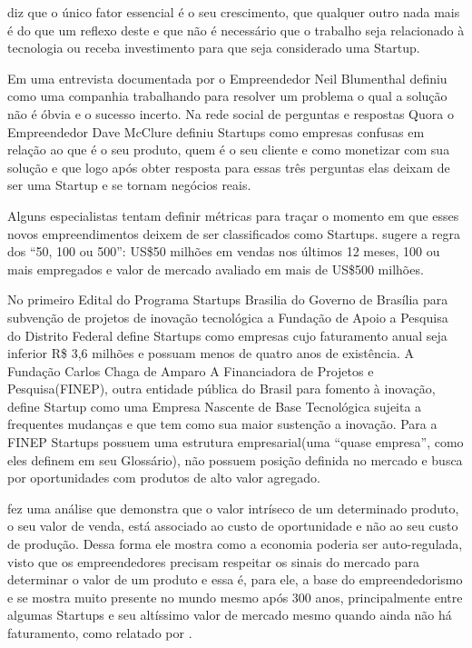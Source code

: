 \cite{Graham2012} diz que o único fator essencial é o seu crescimento, que qualquer outro nada mais é do que um reflexo deste e que não é necessário que o trabalho seja relacionado à tecnologia ou receba investimento para que seja considerado uma Startup.

Em uma entrevista documentada por \cite{Robehmed2013} o Empreendedor Neil Blumenthal definiu como uma companhia trabalhando para resolver um problema o qual a solução não é óbvia e o sucesso incerto. Na rede social de perguntas e respostas Quora o Empreendedor Dave McClure definiu Startups como empresas confusas em relação ao que é o seu produto, quem é o seu cliente e como monetizar com sua solução e que logo após obter resposta para essas três perguntas elas deixam de ser uma Startup e se tornam negócios reais.

Alguns especialistas tentam definir métricas para traçar o momento em que esses novos empreendimentos deixem de ser classificados como Startups. \cite{Wilhelm2014} sugere a regra dos ``50, 100 ou 500'': US\$50 milhões em vendas nos últimos 12 meses, 100 ou mais empregados e valor de mercado avaliado em mais de US\$500 milhões.   

No primeiro Edital do Programa Startups Brasilia do Governo de Brasília para subvenção de projetos de inovação tecnológica a Fundação de Apoio a Pesquisa do Distrito Federal define Startups como empresas cujo faturamento anual seja inferior R\$ 3,6 milhões e possuam menos de quatro anos de existência. A Fundação Carlos Chaga de Amparo A Financiadora de Projetos e Pesquisa(FINEP), outra entidade pública do Brasil para fomento à inovação, define Startup como uma Empresa Nascente de Base Tecnológica sujeita a frequentes mudanças e que tem como sua maior sustenção a inovação. Para a FINEP Startups possuem uma estrutura empresarial(uma ``quase empresa'', como eles definem em seu Glossário), não possuem posição definida no mercado e busca por oportunidades com produtos de alto valor agregado.



\cite{James1953} fez uma análise que demonstra que o valor intríseco de um determinado produto, o seu valor de venda, está associado ao custo de oportunidade e não ao seu custo de produção. Dessa forma ele mostra como a economia poderia ser auto-regulada, visto que os empreendedores precisam respeitar os sinais do mercado para determinar o valor de um produto e essa é, para ele, a base do empreendedorismo e se mostra muito presente no mundo mesmo após 300 anos, principalmente entre algumas Startups e seu altíssimo valor de mercado mesmo quando ainda não há faturamento, como relatado por \cite{Luckerson2013}.

